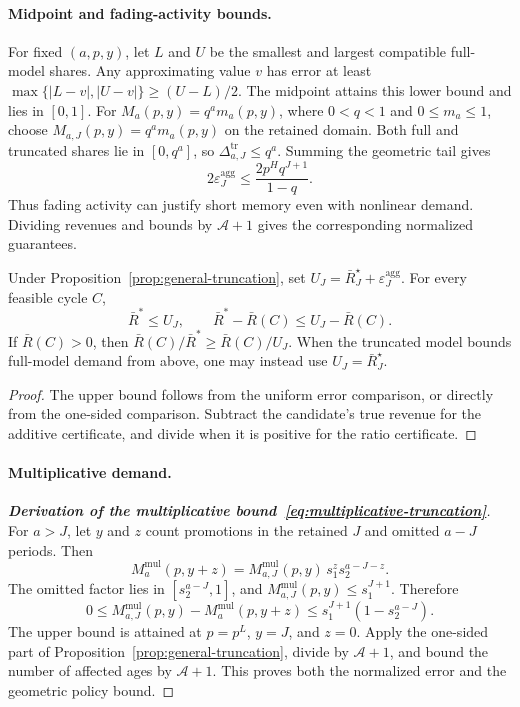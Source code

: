 \paragraph{Midpoint and fading-activity bounds.}
For fixed \((a,p,y)\), let \(L\) and \(U\) be the smallest and largest compatible full-model shares. Any approximating value \(v\) has error at least \(\max\{|L-v|,|U-v|\}\ge(U-L)/2\). The midpoint attains this lower bound and lies in \([0,1]\). For \(M_a(p,y)=q^a m_a(p,y)\), where \(0<q<1\) and \(0\le m_a\le1\), choose \(M_{a,J}(p,y)=q^a m_a(p,y)\) on the retained domain. Both full and truncated shares lie in \([0,q^a]\), so \(\Delta^{\mathrm{tr}}_{a,J}\le q^a\). Summing the geometric tail gives
\[
 2\varepsilon_J^{\mathrm{agg}}
 \le\frac{2p^Hq^{J+1}}{1-q}.
\]
Thus fading activity can justify short memory even with nonlinear demand. Dividing revenues and bounds by \(\mathcal A+1\) gives the corresponding normalized guarantees.

\begin{corollary}
\label{cor:heuristic-certification}
Under Proposition~\ref{prop:general-truncation}, set
\(U_J=\bar R_J^\star+\varepsilon_J^{\mathrm{agg}}\). For every feasible cycle \(C\),
\[
 \bar R^*\le U_J,\qquad
 \bar R^*-\bar R(C)\le U_J-\bar R(C).
\]
If \(\bar R(C)>0\), then \(\bar R(C)/\bar R^*\ge\bar R(C)/U_J\). When the truncated model bounds full-model demand from above, one may instead use \(U_J=\bar R_J^\star\).
\end{corollary}
\begin{proof}
The upper bound follows from the uniform error comparison, or directly from the one-sided comparison. Subtract the candidate's true revenue for the additive certificate, and divide when it is positive for the ratio certificate.
\end{proof}

\paragraph{Multiplicative demand.}
\label{app:mult-computation}
\begin{proof}[\normalfont\bfseries Derivation of the multiplicative bound~\eqref{eq:multiplicative-truncation}]
For \(a>J\), let \(y\) and \(z\) count promotions in the retained \(J\) and omitted \(a-J\) periods. Then
\[
 M_a^{\mathrm{mul}}(p,y+z)
 =M_{a,J}^{\mathrm{mul}}(p,y)\,s_1^zs_2^{a-J-z}.
\]
The omitted factor lies in \([s_2^{a-J},1]\), and \(M_{a,J}^{\mathrm{mul}}(p,y)\le s_1^{J+1}\). Therefore
\[
 0\le M_{a,J}^{\mathrm{mul}}(p,y)-M_a^{\mathrm{mul}}(p,y+z)
 \le s_1^{J+1}(1-s_2^{a-J}).
\]
The upper bound is attained at \(p=p^L\), \(y=J\), and \(z=0\). Apply the one-sided part of Proposition~\ref{prop:general-truncation}, divide by \(\mathcal A+1\), and bound the number of affected ages by \(\mathcal A+1\). This proves both the normalized error and the geometric policy bound.
\end{proof}

